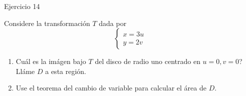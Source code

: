 \documentclass[usepdftitle=false]{beamer}
\begin{document}
\begin{frame}{Ejercicio 14}

Considere la transformaci\'on $T$ dada por
\[\begin{cases}
x=3u\\
y=2v
\end{cases}\]
\begin{enumerate}

\item Cu\'al es la im\'agen bajo $T$ del disco de radio uno centrado en $u=0,v=0$? Ll\'ame $D$ a esta regi\'on.
\item Use el teorema del cambio de variable para calcular el \'area de $D$.

\end{enumerate}



\end{frame}
\end{document}
